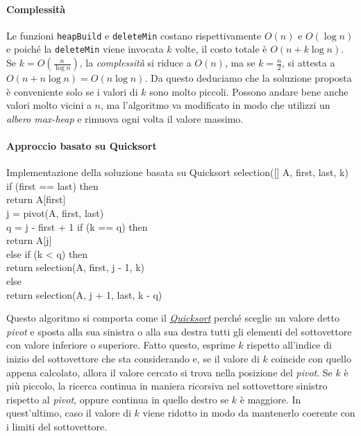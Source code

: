 \paragraph{Complessità}
Le funzioni \texttt{heapBuild} e \texttt{deleteMin} costano rispettivamente
$O(n)$ e $O(\log n)$ e poiché la \texttt{deleteMin} viene invocata $k$ volte,
il costo totale è $O(n+k\log n)$. Se $k=O\left(\frac{n}{\log n}\right)$, la
\emph{complessità} si riduce a $O(n)$, ma se $k=\frac{n}{2}$, si attesta a
$O(n+n\log n)=O(n\log n)$. Da questo deduciamo che la soluzione proposta è
conveniente solo se i valori di $k$ sono molto piccoli. Possono andare bene
anche valori molto vicini a $n$, ma l'algoritmo va modificato in modo che
utilizzi un \emph{albero max-heap} e rimuova ogni volta il valore massimo.

\paragraph{Approccio basato su Quicksort}
\begin{minicode}{Implementazione della soluzione basata su Quicksort}
\ind{} selection([] A,  first,  last,  k)\\
    \indf if (first == last) then\\
        return A[first]\\

    \indf{} j = pivot(A, first, last)\\
    \indf{} q = j - first + 1\hfill{}
    \indf if (k == q) then\\
        return A[j]\\
    \indf else if (k < q) then\\
        return selection(A, first, j - 1, k)\\
    \indf else\\
        return selection(A, j + 1, last, k - q)
\end{minicode}

\noindent
Questo algoritmo si comporta come il \emph{\hyperlink{sec:quick_sort}{Quicksort}}
perché sceglie un valore detto \emph{pivot} e sposta alla sua sinistra o alla
sua destra tutti gli elementi del sottovettore con valore inferiore o superiore.
Fatto questo, esprime $k$ rispetto all'indice di inizio del sottovettore che sta
considerando e, se il valore di $k$ coincide con quello appena calcolato, allora
il valore cercato si trova nella posizione del \emph{pivot}. Se $k$ è più piccolo,
la ricerca continua in maniera ricorsiva nel sottovettore sinistro rispetto al
\emph{pivot}, oppure continua in quello destro se $k$ è maggiore. In quest'ultimo,
caso il valore di $k$ viene ridotto in modo da mantenerlo coerente con i limiti
del sottovettore.

